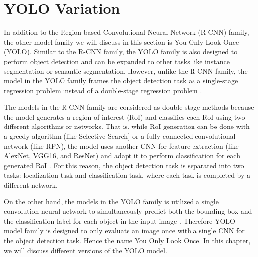 \chapter{YOLO Variation} \label{chap:yolo_variation}

In addition to the Region-based Convolutional Neural Network (R-CNN) family, the other model family we will discuss in this section is You Only Look Once (YOLO). Similar to the R-CNN family, the YOLO family is also designed to perform object detection and can be expanded to other tasks like instance segmentation or semantic segmentation. However, unlike the R-CNN family, the model in the YOLO family frames the object detection task as a single-stage regression problem instead of a double-stage regression problem \cite{yolov3_2018}. 

The models in the R-CNN family are considered as double-stage methods because the model generates a region of interest (RoI) and classifies each RoI using two different algorithms or networks. That is, while RoI generation can be done with a greedy algorithm (like Selective Search) or a fully connected convolutional network (like RPN), the model uses another CNN for feature extraction (like AlexNet, VGG16, and ResNet) and adapt it to perform classification for each generated RoI \cite{Girshick_R_CNN_2013, fast_rcnn_og, faster_rcnn_2015}. For this reason, the object detection task is separated into two tasks: localization task and classification task, where each task is completed by a different network.

On the other hand, the models in the YOLO family is utilized a single convolution neural network to simultaneously predict both the bounding box and the classification label for each object in the input image \cite{yolov1_2016}. Therefore YOLO model family is designed to only evaluate an image once with a single CNN for the object detection task. Hence the name You Only Look Once. In this chapter, we will discuss different versions of the YOLO model.







